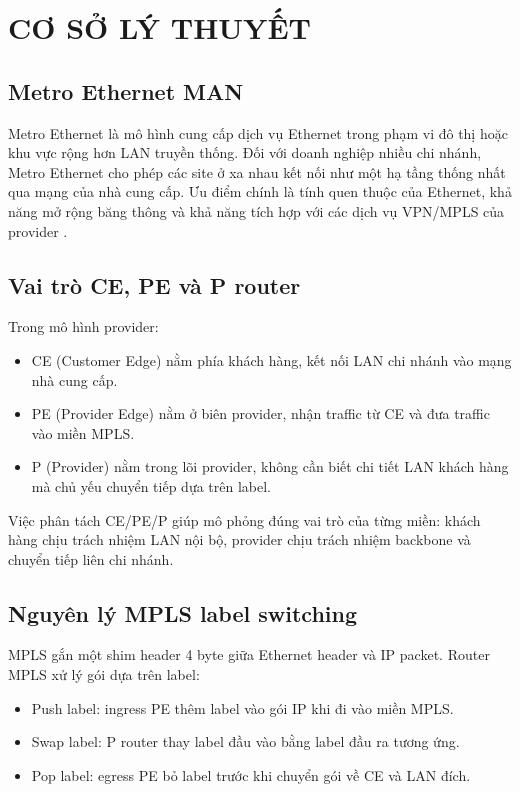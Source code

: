 \section{CƠ SỞ LÝ THUYẾT}

\subsection{Metro Ethernet MAN}

Metro Ethernet là mô hình cung cấp dịch vụ Ethernet trong phạm vi đô thị hoặc khu vực rộng hơn LAN truyền thống. Đối với doanh nghiệp nhiều chi nhánh, Metro Ethernet cho phép các site ở xa nhau kết nối như một hạ tầng thống nhất qua mạng của nhà cung cấp. Ưu điểm chính là tính quen thuộc của Ethernet, khả năng mở rộng băng thông và khả năng tích hợp với các dịch vụ VPN/MPLS của provider \cite{mef}.

\subsection{Vai trò CE, PE và P router}

Trong mô hình provider:
\begin{itemize}
    \item CE (Customer Edge) nằm phía khách hàng, kết nối LAN chi nhánh vào mạng nhà cung cấp.
    \item PE (Provider Edge) nằm ở biên provider, nhận traffic từ CE và đưa traffic vào miền MPLS.
    \item P (Provider) nằm trong lõi provider, không cần biết chi tiết LAN khách hàng mà chủ yếu chuyển tiếp dựa trên label.
\end{itemize}

Việc phân tách CE/PE/P giúp mô phỏng đúng vai trò của từng miền: khách hàng chịu trách nhiệm LAN nội bộ, provider chịu trách nhiệm backbone và chuyển tiếp liên chi nhánh.

\subsection{Nguyên lý MPLS label switching}

MPLS gắn một shim header 4 byte giữa Ethernet header và IP packet. Router MPLS xử lý gói dựa trên label:
\begin{itemize}
    \item Push label: ingress PE thêm label vào gói IP khi đi vào miền MPLS.
    \item Swap label: P router thay label đầu vào bằng label đầu ra tương ứng.
    \item Pop label: egress PE bỏ label trước khi chuyển gói về CE và LAN đích.
\end{itemize}

